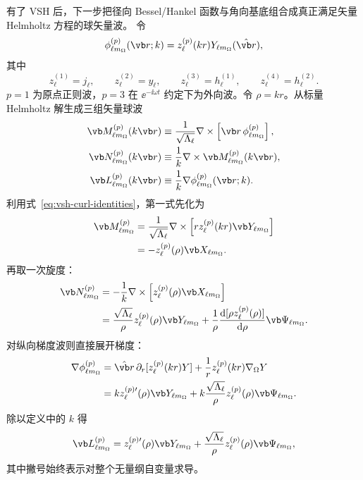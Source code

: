 有了 VSH 后，下一步把径向 Bessel/Hankel 函数与角向基底组合成真正满足矢量 Helmholtz 方程的球矢量波。
令
\begin{equation}
\phi_{\ell m_{\Omega}}^{(p)}(\vb r;k)
=z_\ell^{(p)}(kr)Y_{\ell m_{\Omega}}(\hat{\vb r}),
\label{eq:scalar-spherical-wave}
\end{equation}
其中
\begin{equation}
z_\ell^{(1)}=j_\ell,
\qquad
z_\ell^{(2)}=y_\ell,
\qquad
z_\ell^{(3)}=h_\ell^{(1)},
\qquad
z_\ell^{(4)}=h_\ell^{(2)}.
\end{equation}
$p=1$ 为原点正则波，$p=3$ 在 $\ee^{-\ii\omega t}$ 约定下为外向波。令
$\rho=kr$。从标量 Helmholtz 解生成三组矢量球波
\begin{align}
\vb M_{\ell m_{\Omega}}^{(p)}(k\vb r)
&\equiv
\frac{1}{\sqrt{\Lambda_\ell}}
\nabla\times\left[\vb r\,
\phi_{\ell m_{\Omega}}^{(p)}\right],
\\
\vb N_{\ell m_{\Omega}}^{(p)}(k\vb r)
&\equiv\frac{1}{k}\nabla\times
\vb M_{\ell m_{\Omega}}^{(p)}(k\vb r),
\\
\vb L_{\ell m_{\Omega}}^{(p)}(k\vb r)
&\equiv\frac{1}{k}\nabla
\phi_{\ell m_{\Omega}}^{(p)}(\vb r;k).
\label{eq:MNLG-def}
\end{align}
利用式~\cref{eq:vsh-curl-identities}，第一式先化为
\begin{align}
\vb M_{\ell m_{\Omega}}^{(p)}
&=\frac{1}{\sqrt{\Lambda_\ell}}
\nabla\times
\left[r z_\ell^{(p)}(kr)\vb Y_{\ell m_{\Omega}}\right]
\\
&=-z_\ell^{(p)}(\rho)\vb X_{\ell m_{\Omega}}.
\label{eq:M-vsh-explicit}
\end{align}
再取一次旋度：
\begin{align}
\vb N_{\ell m_{\Omega}}^{(p)}
&=-\frac{1}{k}\nabla\times
\left[z_\ell^{(p)}(\rho)\vb X_{\ell m_{\Omega}}\right]
\\
&=\frac{\sqrt{\Lambda_\ell}}{\rho}
 z_\ell^{(p)}(\rho)\vb Y_{\ell m_{\Omega}}
+\frac{1}{\rho}
\frac{\dd[\rho z_\ell^{(p)}(\rho)]}{\dd\rho}
\vb\Psi_{\ell m_{\Omega}}.
\label{eq:N-vsh-explicit}
\end{align}
对纵向梯度波则直接展开梯度：
\begin{align}
\nabla\phi_{\ell m_\Omega}^{(p)}
&=\hat{\vb r}\,\partial_r[z_\ell^{(p)}(kr)Y]
+\frac{1}{r}z_\ell^{(p)}(kr)\nabla_\Omega Y\\
&=k z_\ell^{(p)\prime}(\rho)\vb Y_{\ell m_\Omega}
+k\frac{\sqrt{\Lambda_\ell}}{\rho}z_\ell^{(p)}(\rho)\vb\Psi_{\ell m_\Omega}.
\end{align}
除以定义中的 $k$ 得
\begin{equation}
\vb L_{\ell m_{\Omega}}^{(p)}
=z_\ell^{(p)\prime}(\rho)\vb Y_{\ell m_{\Omega}}
+\frac{\sqrt{\Lambda_\ell}}{\rho}
 z_\ell^{(p)}(\rho)\vb\Psi_{\ell m_{\Omega}},
\label{eq:L-vsh-explicit}
\end{equation}
其中撇号始终表示对整个无量纲自变量求导。

